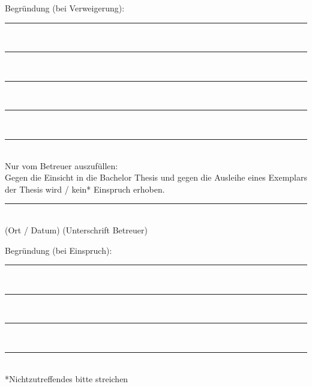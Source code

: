 \par
Begr\"undung (bei Verweigerung): \\[5ex]
\rule[0ex]{\textwidth}{0.4pt} \\[2ex]
\rule[0ex]{\textwidth}{0.4pt} \\[2ex]
\rule[0ex]{\textwidth}{0.4pt} \\[2ex]
\rule[0ex]{\textwidth}{0.4pt} \\[2ex]
\rule[0ex]{\textwidth}{0.4pt} \\[5ex]
Nur vom Betreuer auszuf\"ullen: \\[2ex]
Gegen die Einsicht in die Bachelor Thesis  und gegen die Ausleihe eines Exemplars der Thesis wird / kein* Einspruch 
erhoben.
\par \vspace{10mm}
\rule[0ex]{\textwidth}{0.4pt}\\
(Ort / Datum)\hspace{30ex} (Unterschrift Betreuer)
\par
Begr\"undung (bei Einspruch): \\[5ex]
\rule[0ex]{\textwidth}{0.4pt} \\[2ex]
\rule[0ex]{\textwidth}{0.0pt} \\[2ex]
\rule[0ex]{\textwidth}{0.4pt} \\[2ex]
\rule[0ex]{\textwidth}{0.4pt} \\[5ex]
*Nichtzutreffendes bitte streichen
%
